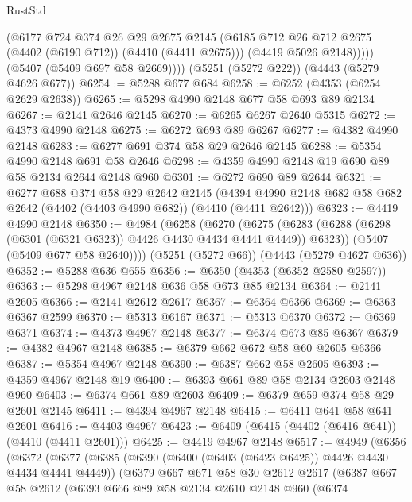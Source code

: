 \begin{lexlean}{RustStd}
\begin{coremodule}
              (@6177
                @724
                @374
                @26
                @29
                @2675
                @2145
                (@6185 @712 @26 @712 @2675 (@4402 (@6190 @712)) (@4410 (@4411 @2675)))
                (@4419 @5026 @2148)))))
        (@5407 (@5409 @697 @58 @2669))))
    (@5251 (@5272 @222))
    (@4443 (@5279 @4626 @677))
@6254 := @5288 @677 @684
@6258 := @6252 (@4353 (@6254 @2629 @2638))
@6265 := @5298 @4990 @2148 @677 @58 @693 @89 @2134
@6267 := @2141 @2646 @2145
@6270 := @6265 @6267 @2640 @5315
@6272 := @4373 @4990 @2148
@6275 := @6272 @693 @89 @6267
@6277 := @4382 @4990 @2148
@6283 := @6277 @691 @374 @58 @29 @2646 @2145
@6288 := @5354 @4990 @2148 @691 @58 @2646
@6298 := @4359 @4990 @2148 @19 @690 @89 @58 @2134 @2644 @2148 @960
@6301 := @6272 @690 @89 @2644
@6321 := @6277
    @688
    @374
    @58
    @29
    @2642
    @2145
    (@4394 @4990 @2148 @682 @58 @682 @2642 (@4402 (@4403 @4990 @682)) (@4410 (@4411 @2642)))
@6323 := @4419 @4990 @2148
@6350 := @4984
    (@6258
      (@6270
        (@6275 (@6283 (@6288 (@6298 (@6301 (@6321 @6323)) @4426 @4430 @4434 @4441 @4449)) @6323))
        (@5407 (@5409 @677 @58 @2640))))
    (@5251 (@5272 @66))
    (@4443 (@5279 @4627 @636))
@6352 := @5288 @636 @655
@6356 := @6350 (@4353 (@6352 @2580 @2597))
@6363 := @5298 @4967 @2148 @636 @58 @673 @85 @2134
@6364 := @2141 @2605
@6366 := @2141 @2612 @2617
@6367 := @6364 @6366
@6369 := @6363 @6367 @2599
@6370 := @5313 @6167
@6371 := @5313 @6370
@6372 := @6369 @6371
@6374 := @4373 @4967 @2148
@6377 := @6374 @673 @85 @6367
@6379 := @4382 @4967 @2148
@6385 := @6379 @662 @672 @58 @60 @2605 @6366
@6387 := @5354 @4967 @2148
@6390 := @6387 @662 @58 @2605
@6393 := @4359 @4967 @2148 @19
@6400 := @6393 @661 @89 @58 @2134 @2603 @2148 @960
@6403 := @6374 @661 @89 @2603
@6409 := @6379 @659 @374 @58 @29 @2601 @2145
@6411 := @4394 @4967 @2148
@6415 := @6411 @641 @58 @641 @2601
@6416 := @4403 @4967
@6423 := @6409 (@6415 (@4402 (@6416 @641)) (@4410 (@4411 @2601)))
@6425 := @4419 @4967 @2148
@6517 := @4949
    (@6356
      (@6372
        (@6377
          (@6385
            (@6390 (@6400 (@6403 (@6423 @6425)) @4426 @4430 @4434 @4441 @4449))
            (@6379
              @667
              @671
              @58
              @30
              @2612
              @2617
              (@6387
                @667
                @58
                @2612
                (@6393
                  @666
                  @89
                  @58
                  @2134
                  @2610
                  @2148
                  @960
                  (@6374

\end{coremodule}
\end{lexlean}
